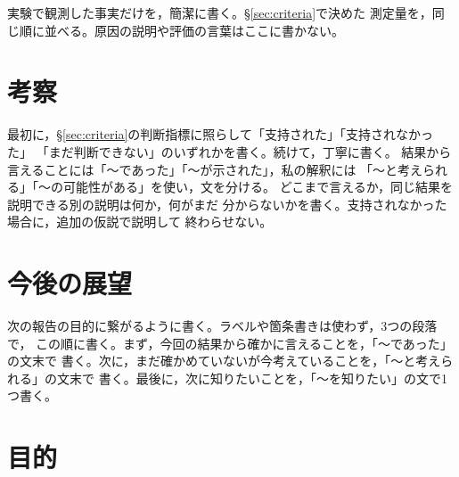 \documentclass[twocolumn, 10pt]{ujarticle}
\begin{document}
実験で観測した事実だけを，簡潔に書く。\S\ref{sec:criteria}で決めた
測定量を，同じ順に並べる。原因の説明や評価の言葉はここに書かない。

\section{考察}\label{sec:disc}

最初に，\S\ref{sec:criteria}の判断指標に照らして「支持された」「支持されなかった」
「まだ判断できない」のいずれかを書く。続けて，丁寧に書く。
結果から言えることには「〜であった」「〜が示された」，私の解釈には
「〜と考えられる」「〜の可能性がある」を使い，文を分ける。
どこまで言えるか，同じ結果を説明できる別の説明は何か，何がまだ
分からないかを書く。支持されなかった場合に，追加の仮説で説明して
終わらせない。

\section{今後の展望}\label{sec:future}

次の報告の目的に繋がるように書く。ラベルや箇条書きは使わず，3つの段落で，
この順に書く。まず，今回の結果から確かに言えることを，「〜であった」の文末で
書く。次に，まだ確かめていないが今考えていることを，「〜と考えられる」の文末で
書く。最後に，次に知りたいことを，「〜を知りたい」の文で1つ書く。

\clearpage

\beginverification

\section{目的}\label{sec:e-purpose}
\end{document}
